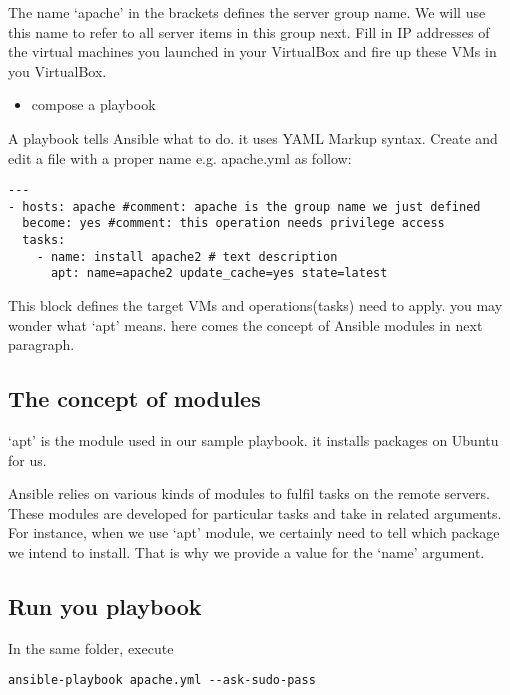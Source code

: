 The name `apache' in the brackets defines the server group name. We will
use this name to refer to all server items in this group next. Fill in
IP addresses of the virtual machines you launched in your VirtualBox and
fire up these VMs in you VirtualBox.

\begin{itemize}

\item
  compose a playbook
\end{itemize}

A playbook tells Ansible what to do. it uses YAML Markup syntax. Create
and edit a file with a proper name e.g. apache.yml as follow:

\begin{verbatim}
---
- hosts: apache #comment: apache is the group name we just defined
  become: yes #comment: this operation needs privilege access
  tasks:
    - name: install apache2 # text description
      apt: name=apache2 update_cache=yes state=latest
\end{verbatim}

This block defines the target VMs and operations(tasks) need to apply.
you may wonder what `apt' means. here comes the concept of Ansible
modules in next paragraph.

\subsection{The concept of modules}\label{the-concept-of-modules}

`apt' is the module used in our sample playbook. it installs packages on
Ubuntu for us.

Ansible relies on various kinds of modules to fulfil tasks on the remote
servers. These modules are developed for particular tasks and take in
related arguments. For instance, when we use `apt' module, we certainly
need to tell which package we intend to install. That is why we provide
a value for the `name' argument.

\subsection{Run you playbook}\label{run-you-playbook}

In the same folder, execute

\begin{lstlisting}
ansible-playbook apache.yml --ask-sudo-pass
\end{lstlisting}

